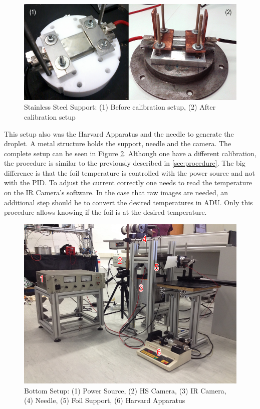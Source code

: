 \begin{figure}[h]
\centering
\includegraphics[width=0.9\linewidth]{Figures/3.Chapter/suporte.png}
\caption{Stainless Steel Support: (1) Before calibration setup, (2) After calibration setup}
\label{fig:suporte}
\end{figure}

\par This setup also was the Harvard Apparatus and the needle to generate the droplet. A metal structure holds the support, needle and the camera. The complete setup can be seen in Figure \ref{fig:setup2}. Although one have a different calibration, the procedure is similar to the previously described in \ref{sec:procedure}. The big difference is that the foil temperature is controlled with the power source and not with the PID. To adjust the current correctly one needs to read the temperature on the IR Camera's software. In the case that raw images are needed, an additional step should be to convert the desired temperatures in ADU. Only this procedure allows knowing if the foil is at the desired temperature.

\begin{figure}[h]
\centering
\includegraphics[width=0.9\linewidth]{Figures/3.Chapter/setup2.png}
\caption{Bottom Setup: (1) Power Source, (2) HS Camera, (3) IR Camera, (4) Needle, (5) Foil Support, (6) Harvard Apparatus}
\label{fig:setup2}
\end{figure}

